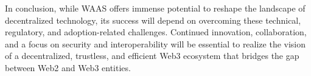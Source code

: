 In conclusion, while WAAS offers immense potential to reshape the landscape of decentralized technology, its success will depend on overcoming these technical, regulatory, and adoption-related challenges. Continued innovation, collaboration, and a focus on security and interoperability will be essential to realize the vision of a decentralized, trustless, and efficient Web3 ecosystem that bridges the gap between Web2 and Web3 entities.